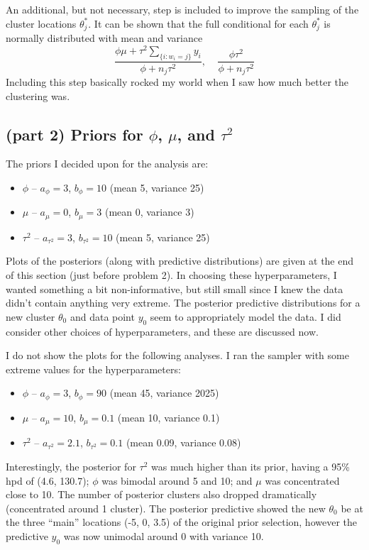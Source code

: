 \documentclass[12pt]{article}
\begin{document}
An additional, but not necessary, step is included to improve the sampling of the cluster locations $\theta_j^*$. It can be shown that the full conditional for each $\theta_j^*$ is normally distributed with mean and variance
\[ \frac{\phi\mu+\tau^2\sum_{\{i:w_i=j\}}y_i}{\phi+n_j\tau^2},~~~~~\frac{\phi\tau^2}{\phi+n_j\tau^2} \]
Including this step basically rocked my world when I saw how much better the clustering was.

\subsection*{(part 2) Priors for $\phi$, $\mu$, and $\tau^2$}

The priors I decided upon for the analysis are:
\begin{itemize}[label=$\cdot$]
\item $\phi$ -- $a_\phi=3$, $b_\phi=10$ (mean 5, variance 25)
\item $\mu$ -- $a_\mu=0$, $b_\mu=3$ (mean 0, variance 3)
\item $\tau^2$ -- $a_{\tau^2}=3$, $b_{\tau^2}=10$ (mean 5, variance 25)
\end{itemize}
Plots of the posteriors (along with predictive distributions) are given at the end of this section (just before problem 2). In choosing these hyperparameters, I wanted something a bit non-informative, but still small since I knew the data didn't contain anything very extreme. The posterior predictive distributions for a new cluster $\theta_0$ and data point $y_0$ seem to appropriately model the data. I did consider other choices of hyperparameters, and these are discussed now.

I do not show the plots for the following analyses. I ran the sampler with some extreme values for the hyperparameters:
\begin{itemize}[label=$\cdot$]
\item $\phi$ -- $a_\phi=3$, $b_\phi=90$ (mean 45, variance 2025)
\item $\mu$ -- $a_\mu=10$, $b_\mu=0.1$ (mean 10, variance 0.1)
\item $\tau^2$ -- $a_{\tau^2}=2.1$, $b_{\tau^2}=0.1$ (mean 0.09, variance 0.08)
\end{itemize}
Interestingly, the posterior for $\tau^2$ was much higher than its prior, having a 95\% hpd of (4.6, 130.7); $\phi$ was bimodal around 5 and 10; and $\mu$ was concentrated close to 10. The number of posterior clusters also dropped dramatically (concentrated around 1 cluster). The posterior predictive showed the new $\theta_0$ be at the three ``main'' locations (-5, 0, 3.5) of the original prior selection, however the predictive $y_0$ was now unimodal around 0 with variance 10.
\end{document}
